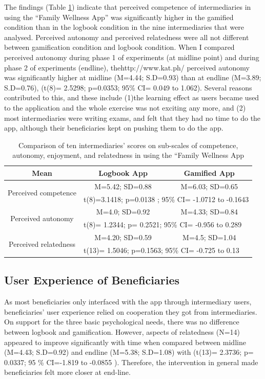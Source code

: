The findings (Table \ref{table:imiwellnessinterm}) indicate that perceived competence of intermediaries in using the ``Family Wellness App'' was significantly higher in the gamified condition than in the logbook condition in the nine intermediaries that were analysed. Perceived autonomy and perceived relatedness were all not different between gamification condition and logbook condition. When I compared perceived autonomy during phase 1 of experiments (at midline point) and during phase 2 of experiments (endline), thehttp://www.kat.ph/ perceived autonomy was significantly higher at midline (M=4.44; S.D=0.93) than at endline (M=3.89; S.D=0.76), (t(8)= 2.5298; p=0.0353; 95\% CI= 0.049 to 1.062). Several reasons contributed to this, and these include (1)the learning effect as users became used to the application and the whole exercise was not exciting any more, and (2) most intermediaries were writing exams, and felt that they had no time to do the app, although their beneficiaries kept on pushing them to do the app.

\begin{table}[h!]
  \begin{center}
    \caption{Comparison of ten intermediaries' scores on sub-scales of competence, autonomy, enjoyment, and relatedness in using the ``Family Wellness App}
    \label{table:imiwellnessinterm}
	\begin{tabular}{|c|c|c|}
		\hline
		Mean &Logbook App&Gamified App\\
		\hline
		 \multirow{2}{*}{Perceived competence}&M=5.42; SD=0.88&M=6.03; SD=0.65\\\cline{2-3} 

		 &\multicolumn{2}{|l|}{t(8)=3.1418; p=0.0138 ; 95\% CI= -1.0712 to -0.1643 } \\
\hline
		 \multirow{2}{*}{Perceived autonomy}&M=4.0; SD=0.92&M=4.33; SD=0.84\\\cline{2-3} 

		 &\multicolumn{2}{|l|}{t(8)= 1.2344; p= 0.2521; 95\% CI=  -0.956 to 0.289 } \\
\hline
		 \multirow{2}{*}{Perceived relatedness}&M=4.20; SD=0.59&M=4.5; SD=1.04\\\cline{2-3} 
		 &\multicolumn{2}{|l|}{t(13)= 1.5046; p=0.1563; 95\% CI= -0.725 to 0.13 } \\
\hline
	\end{tabular}
  \end{center}
\end{table}
\subsection{User Experience of Beneficiaries}
As most beneficiaries only interfaced with the app through intermediary users, beneficiaries' user experience relied on cooperation they got from intermediaries. On support for the three basic psychological needs, there was no difference between logbook and gamification. However, aspects of relatedness (N=14) appeared to improve significantly with time when compared between midline (M=4.43; S.D=0.92) and endline (M=5.38; S.D=1.08) with (t(13)= 2.3736; p= 0.0337; 95 \% CI=-1.819 to -0.0855 ). Therefore, the intervention in general made beneficiaries felt more closer at end-line.

